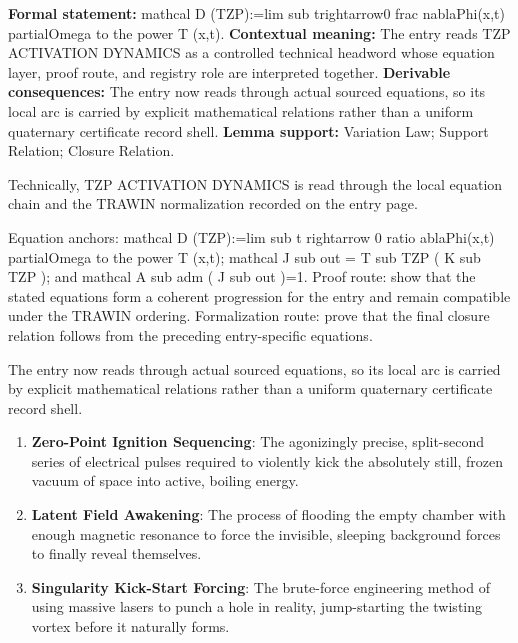 \begingroup\footnotesize\setlength{\emergencystretch}{3em}\sloppy
\textbf{Formal statement:} mathcal D (TZP):=lim sub trightarrow0 frac nablaPhi(x,t) partialOmega to the power T (x,t). \textbf{Contextual meaning:} The entry reads TZP ACTIVATION DYNAMICS as a controlled technical headword whose equation layer, proof route, and registry role are interpreted together. \textbf{Derivable consequences:} The entry now reads through actual sourced equations, so its local arc is carried by explicit mathematical relations rather than a uniform quaternary certificate record shell. \textbf{Lemma support:} Variation Law; Support Relation; Closure Relation.\par
\endgroup

Technically, TZP ACTIVATION DYNAMICS is read through the local equation chain and the TRAWIN normalization recorded on the entry page.

Equation anchors: mathcal D (TZP):=lim sub t rightarrow 0 ratio ablaPhi(x,t) partialOmega to the power T (x,t); mathcal J sub out = T sub TZP ( K sub TZP ); and mathcal A sub adm ( J sub out )=1. Proof route: show that the stated equations form a coherent progression for the entry and remain compatible under the TRAWIN ordering. Formalization route: prove that the final closure relation follows from the preceding entry-specific equations.

The entry now reads through actual sourced equations, so its local arc is carried by explicit mathematical relations rather than a uniform quaternary certificate record shell.
\endgroup

\begin{enumerate}[leftmargin=1.6em,itemsep=6pt,topsep=4pt]
\item \textbf{Zero-Point Ignition Sequencing}: The agonizingly precise, split-second series of electrical pulses required to violently kick the absolutely still, frozen vacuum of space into active, boiling energy.
\item \textbf{Latent Field Awakening}: The process of flooding the empty chamber with enough magnetic resonance to force the invisible, sleeping background forces to finally reveal themselves.
\item \textbf{Singularity Kick-Start Forcing}: The brute-force engineering method of using massive lasers to punch a hole in reality, jump-starting the twisting vortex before it naturally forms.
\end{enumerate}

